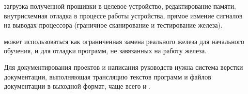 
  загрузка полученной прошивки в целевое устройство, редактирование памяти,
  внутрисхемная отладка в процессе работы устройства, прямое измение сигналов на
  выводах процессора (граничное сканирование и тестирование железа).


  может использоваться как ограниченная замена реального железа
  для начального обучения, и для отладки программ, не завязанных на работу
  железа.


  Для документирования проектов и написания руководств нужна система верстки
  документации, выполняющая трансляцию текстов программ и файлов
  документации в выходной формат, чаще всего  и .
   
\secup\secup
